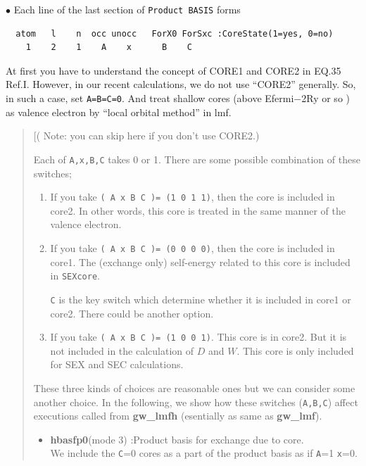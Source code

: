 \documentclass[a4paper,10pt,epsf,fleqn]{article}
\newcommand{\exe}[1]{{\bf #1}}
\newcommand{\raw}[1]{{\tt #1}}
\begin{document}
{\vspace{5mm}
\noindent $\bullet$ Each line of the last section of {\tt Product BASIS} forms
{\baselineskip=2.6mm
\begin{verbatim}
  atom   l    n  occ unocc   ForX0 ForSxc :CoreState(1=yes, 0=no)
    1    2    1    A    x      B    C
\end{verbatim}}
At first you have to understand the concept of CORE1 and CORE2 in EQ.35 Ref.I.
However, in our recent calculations, we do not use ``CORE2'' generally.
So, in such a case, set \verb#A=B=C=0#. And treat shallow cores (above Efermi$-$2Ry or so )
as valence electron by ``local orbital method'' in lmf.

\begin{quote}
[( Note: you can skip here if you don't use CORE2.)

Each of \raw{A,x,B,C} takes 0 or 1.
There are some possible combination of these switches;
\begin{enumerate}
\item 
If you take 
{\tt ( A  x   B    C )= (1 0 1 1)},
then the core is included in core2. In other words, this core is treated in the same 
manner of the valence electron.

\item 
If you take
{\tt ( A  x   B    C )= (0 0 0 0)},
then the core is included in core1.
The (exchange only) self-energy related to this core is included in {\tt SEXcore}.

\raw{C} is the key switch which determine whether it is included in core1 or core2.
There could be another option.

\item 
If you take
{\tt ( A  x   B    C )= (1 0 0 1)}.
This core is in core2. But it is not included in the calculation of $D$ and $W$.
This core is only included for SEX and SEC calculations.
\end{enumerate}
These three kinds of choices are reasonable ones but we can consider some another choice.
In the following, we show how these switches (\verb#A,B,C#) affect executions called from 
\exe{gw\_lmfh} (esentially as same as \exe{gw\_lmf}).
\begin{itemize}
\item 
\exe{hbasfp0}(mode 3) :Product basis for exchange due to core.\\
We include the \raw{C}=0 cores as a part of
the product basis as if \raw{A}=1 \raw{x}=0.


\end{itemize}
\end{quote}}
\end{document}
